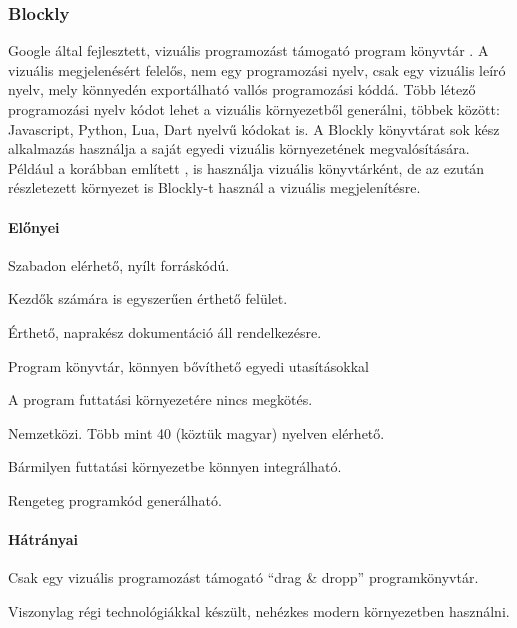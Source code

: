 \documentclass[12pt,a4paper,oneside]{report} %
\begin{document}
\subsubsection{Blockly}
\label{blocly}
Google által fejlesztett, vizuális programozást támogató program könyvtár \cite{BlocklyUrl2020Feb} \cite{pasternak2017tips}. A vizuális megjelenésért felelős, nem egy programozási nyelv, csak egy vizuális leíró nyelv, mely könnyedén exportálható vallós programozási kóddá. Több létező programozási nyelv kódot lehet a vizuális környezetből generálni, többek között: Javascript, Python, Lua, Dart nyelvű kódokat is. A Blockly könyvtárat sok kész alkalmazás használja a saját egyedi vizuális környezetének megvalósítására.
Például a korábban említett ,  is használja vizuális könyvtárként, de az ezután részletezett  környezet is Blockly-t használ a vizuális megjelenítésre.
\paragraph{Előnyei} 
\begin{compactitem}
	\item Szabadon elérhető, nyílt forráskódú.
	\item Kezdők számára is egyszerűen érthető felület.
	\item Érthető, naprakész dokumentáció áll rendelkezésre.
	\item Program könyvtár, könnyen bővíthető egyedi utasításokkal
	\item A program futtatási környezetére nincs megkötés.
	\item Nemzetközi. Több mint 40 (köztük magyar) nyelven elérhető.
	\item Bármilyen futtatási környezetbe könnyen integrálható.
	\item Rengeteg programkód generálható.
\end{compactitem}
\paragraph{Hátrányai} 
\begin{compactitem}
	\item Csak egy vizuális programozást támogató  ``drag \& dropp'' programkönyvtár.
	\item Viszonylag régi technológiákkal készült, nehézkes modern környezetben használni.
\end{compactitem}
\end{document}
